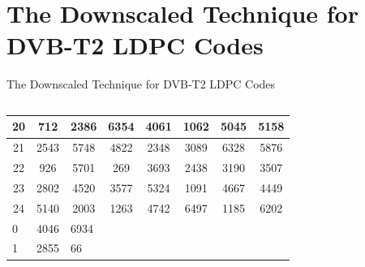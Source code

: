 \documentclass[11pt, aspectratio=169]{beamer}
\begin{document}
\section{The Downscaled Technique for DVB-T2 LDPC Codes}
\begin{frame}{The Downscaled Technique for DVB-T2 LDPC Codes}
\begin{columns}
\begin{table}[tb]
\begin{adjustbox}{width=0.8\textwidth , totalheight=\baselineskip,keepaspectratio}
	\begin{tabular}{|l|l|l|lllll}
		\hline
		\multicolumn{1}{|c|}{20} & \multicolumn{1}{c|}{712}  & \multicolumn{1}{c|}{2386} & \multicolumn{1}{c|}{6354} & \multicolumn{1}{c|}{4061} & \multicolumn{1}{c|}{1062} & \multicolumn{1}{c|}{5045} & \multicolumn{1}{c|}{5158} \\ \hline
		\multicolumn{1}{|c|}{21} & \multicolumn{1}{c|}{2543} & \multicolumn{1}{c|}{5748} & \multicolumn{1}{c|}{4822} & \multicolumn{1}{c|}{2348} & \multicolumn{1}{c|}{3089} & \multicolumn{1}{c|}{6328} & \multicolumn{1}{c|}{5876} \\ \hline
		\multicolumn{1}{|c|}{22} & \multicolumn{1}{c|}{926}  & \multicolumn{1}{c|}{5701} & \multicolumn{1}{c|}{269}  & \multicolumn{1}{c|}{3693} & \multicolumn{1}{c|}{2438} & \multicolumn{1}{c|}{3190} & \multicolumn{1}{c|}{3507} \\ \hline
		\multicolumn{1}{|c|}{23} & \multicolumn{1}{c|}{2802} & \multicolumn{1}{c|}{4520} & \multicolumn{1}{c|}{3577} & \multicolumn{1}{c|}{5324} & \multicolumn{1}{c|}{1091} & \multicolumn{1}{c|}{4667} & \multicolumn{1}{c|}{4449} \\ \hline
		\multicolumn{1}{|c|}{24} & \multicolumn{1}{c|}{5140} & \multicolumn{1}{c|}{2003} & \multicolumn{1}{c|}{1263} & \multicolumn{1}{c|}{4742} & \multicolumn{1}{c|}{6497} & \multicolumn{1}{c|}{1185} & \multicolumn{1}{c|}{6202} \\ \hline
		0                        & 4046                      & 6934                      &                           &                           &                           &                           &                           \\ \cline{1-3}
		1                        & 2855                      & 66                        &                           &                           &                           &                           &                           \\ \cline{1-3}

\end{tabular}
\end{adjustbox}
\end{table}
\end{columns}
\end{frame}
\end{document}

